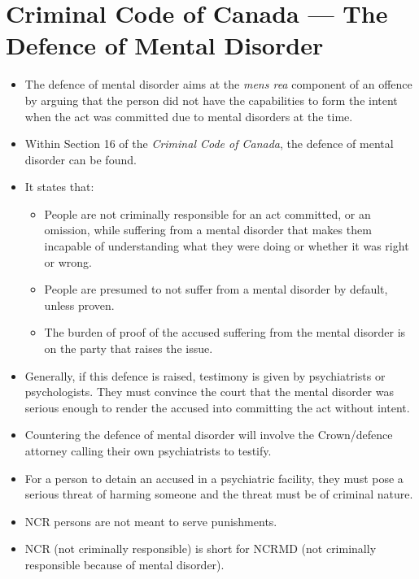 \documentclass{article}
\begin{document}
\section{Criminal Code of Canada --- The Defence of Mental Disorder}
\begin{itemize}
    \item The defence of mental disorder aims at the \emph{mens rea} component of an offence by arguing that the person did not have the capabilities to form the intent when the act was committed due to mental disorders at the time.
    \item Within Section 16 of the \emph{Criminal Code of Canada}, the defence of mental disorder can be found.
    \item It states that:
        \begin{itemize}
            \item People are not criminally responsible for an act committed, or an omission, while suffering from a mental disorder that makes them incapable of understanding what they were doing or whether it was right or wrong.
            \item People are presumed to not suffer from a mental disorder by default, unless proven.
            \item The burden of proof of the accused suffering from the mental disorder is on the party that raises the issue.
        \end{itemize}
    \item Generally, if this defence is raised, testimony is given by psychiatrists or psychologists.  They must convince the court that the mental disorder was serious enough to render the accused into committing the act without intent.
    \item Countering the defence of mental disorder will involve the Crown/defence attorney calling their own psychiatrists to testify.
    \item For a person to detain an accused in a psychiatric facility, they must pose a serious threat of harming someone and the threat must be of criminal nature.
    \item NCR persons are not meant to serve punishments.
    \item NCR (not criminally responsible) is short for NCRMD (not criminally responsible because of mental disorder).
\end{itemize}
\end{document}
